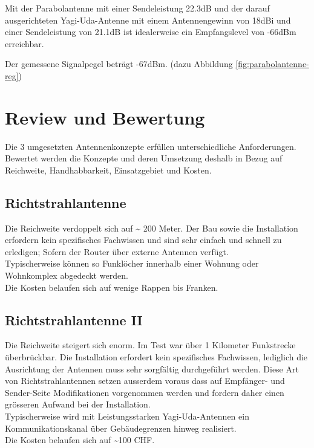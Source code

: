\documentclass[oneside,11pt,parskip=half,ngerman]{scrreprt}
\begin{document}
Mit der Parabolantenne mit einer Sendeleistung 22.3dB und der darauf
ausgerichteten Yagi-Uda-Antenne mit einem Antennengewinn von 18dBi und
einer Sendeleistung von 21.1dB ist idealerweise ein Empfangslevel von
-66dBm erreichbar.

Der gemessene Signalpegel beträgt -67dBm. (dazu Abbildung
\ref{fig:parabolantenne-reg})

\chapter{Review und Bewertung}\label{review-und-bewertung}

Die 3 umgesetzten Antennenkonzepte erfüllen unterschiedliche
Anforderungen. Bewertet werden die Konzepte und deren Umsetzung deshalb
in Bezug auf Reichweite, Handhabbarkeit, Einsatzgebiet und Kosten.

\section{Richtstrahlantenne}\label{richtstrahlantenne-2}

Die Reichweite verdoppelt sich auf \textasciitilde{} 200 Meter. Der Bau
sowie die Installation erfordern kein spezifisches Fachwissen und sind
sehr einfach und schnell zu erledigen; Sofern der Router über externe
Antennen verfügt.\\Typischerweise können so Funklöcher innerhalb einer
Wohnung oder Wohnkomplex abgedeckt werden.\\Die Kosten belaufen sich auf
wenige Rappen bis Franken.

\section{Richtstrahlantenne II}\label{richtstrahlantenne-ii-1}

Die Reichweite steigert sich enorm. Im Test war über 1 Kilometer
Funkstrecke überbrückbar. Die Installation erfordert kein spezifisches
Fachwissen, lediglich die Ausrichtung der Antennen muss sehr sorgfältig
durchgeführt werden. Diese Art von Richtstrahlantennen setzen ausserdem
voraus dass auf Empfänger- und Sender-Seite Modifikationen vorgenommen
werden und fordern daher einen grösseren Aufwand bei der
Installation.\\Typischerweise wird mit Leistungsstarken
Yagi-Uda-Antennen ein Kommunikationskanal über Gebäudegrenzen hinweg
realisiert.\\Die Kosten belaufen sich auf \textasciitilde{}100 CHF.
\end{document}
